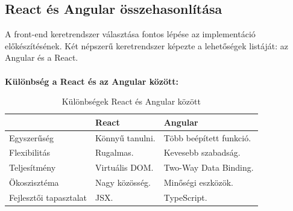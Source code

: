 \subsection*{React és Angular összehasonlítása}
A front-end keretrendszer választása fontos lépése az implementáció előkészítésének. Két népszerű keretrendszer képezte a lehetőségek listáját: az Angular és a React.
\\
\\
\textbf{Különbség a React és az Angular között:}
\begin{table}[h]
    \centering
    \begin{tabular}{|l|l|l|}
        \hline
                               & React           & Angular                 \\
        \hline
        Egyszerűség            & Könnyű tanulni. & Több beépített funkció. \\
        \hline
        Flexibilitás           & Rugalmas.       & Kevesebb szabadság.     \\
        \hline
        Teljesítmény           & Virtuális DOM.  & Two-Way Data Binding.   \\
        \hline
        Ökoszisztéma           & Nagy közösség.  & Minőségi eszközök.      \\
        \hline
        Fejlesztői tapasztalat & JSX.            & TypeScript.             \\
        \hline
    \end{tabular}
    \caption[Különbségek React és Angular között]{Különbségek React és Angular között}
\end{table}
